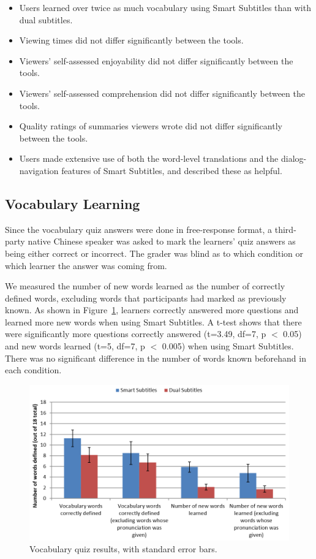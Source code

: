\documentclass{sigchi}
\begin{document}
\begin{itemize}[noitemsep]
\item Users learned over twice as much vocabulary using Smart Subtitles than with dual subtitles.
\item Viewing times did not differ significantly between the tools.
\item Viewers' self-assessed enjoyability did not differ significantly between the tools.
\item Viewers' self-assessed comprehension did not differ significantly between the tools.
\item Quality ratings of summaries viewers wrote did not differ significantly
between the tools.
\item Users made extensive use of both the word-level translations and the dialog-navigation features of Smart Subtitles, and described these as helpful.
\end{itemize}

\subsection{Vocabulary Learning}

Since the vocabulary quiz answers were done in free-response format, a third-party native Chinese speaker was asked to mark the learners' quiz answers as being either correct or incorrect. The grader was blind as to which condition or which learner the answer was coming from.

We measured the number of new words learned as the number of correctly defined words, excluding words that participants had marked as previously known. As shown in Figure~\ref{fig:figure6}, learners correctly answered more questions and learned more new words when using Smart Subtitles. A t-test shows that there were significantly more questions correctly answered (t=3.49, df=7, p $<$ 0.05) and new words learned (t=5, df=7, p $<$ 0.005) when using Smart Subtitles.
There was no significant difference in the number of words known beforehand in each condition.

\begin{figure}[!h]
\centering
\includegraphics[width=\columnwidth]{vocab-quiz-results}
\caption{Vocabulary quiz results, with standard error bars.}
\label{fig:figure6}
\end{figure}
\end{document}

